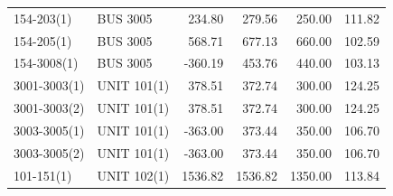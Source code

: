 \documentclass[10pt]{report}
\begin{document}
\begin{table}[H]
{\begin{tabular}{llrrrr}
154-203(1) & BUS 3005 & 234.80 & 279.56 & 250.00 & 111.82 \\
154-205(1) & BUS 3005 & 568.71 & 677.13 & 660.00 & 102.59 \\
154-3008(1) & BUS 3005 & -360.19 & 453.76 & 440.00 & 103.13 \\
3001-3003(1) & UNIT 101(1) & 378.51 & 372.74 & 300.00 & 124.25 \\
3001-3003(2) & UNIT 101(1) & 378.51 & 372.74 & 300.00 & 124.25 \\
3003-3005(1) & UNIT 101(1) & -363.00 & 373.44 & 350.00 & 106.70 \\
3003-3005(2) & UNIT 101(1) & -363.00 & 373.44 & 350.00 & 106.70 \\
101-151(1) & UNIT 102(1) & 1536.82 & 1536.82 & 1350.00 & 113.84 \\
\bottomrule
\end{tabular}}
\end{table}
\end{document}
